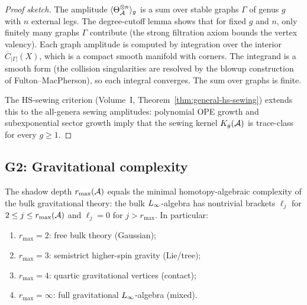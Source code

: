 \begin{proof}[Proof sketch]
The amplitude $\langle \Theta_{\mathcal{A}}^{\otimes n} \rangle_g$ is a sum over
stable graphs $\Gamma$ of genus $g$ with $n$ external legs. The degree-cutoff
lemma shows that for fixed $g$ and $n$, only finitely many graphs $\Gamma$
contribute (the strong filtration axiom bounds the vertex valency).
Each graph amplitude is computed by integration over the interior
$\overline{C}_{|\Gamma|}(X)$, which is a compact smooth manifold with
corners. The integrand is a smooth form (the collision singularities are
resolved by the blowup construction of Fulton--MacPherson), so each
integral converges. The sum over graphs is finite.

The HS-sewing criterion (Volume~I, Theorem~\ref{thm:general-hs-sewing})
extends this to the all-genera sewing amplitudes: polynomial OPE growth
and subexponential sector growth imply that the sewing kernel
$K_g(\mathcal{A})$ is trace-class for every $g \ge 1$.
\end{proof}


\subsection{G2: Gravitational complexity}

\begin{theorem}
The shadow depth $r_{\max}(\mathcal{A})$ equals the minimal
homotopy-algebraic complexity of the bulk gravitational theory:
the bulk $L_\infty$-algebra has nontrivial brackets $\ell_j$
for $2 \le j \le r_{\max}(\mathcal{A})$ and $\ell_j = 0$ for $j > r_{\max}$.
In particular:
\begin{enumerate}[label=\textup{(\roman*)}]
\item $r_{\max} = 2$: free bulk theory (Gaussian);
\item $r_{\max} = 3$: semistrict higher-spin gravity (Lie/tree);
\item $r_{\max} = 4$: quartic gravitational vertices (contact);
\item $r_{\max} = \infty$: full gravitational $L_\infty$-algebra (mixed).
\end{enumerate}
\end{theorem}

